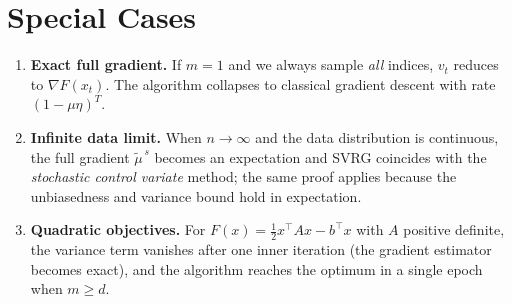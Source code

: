 \documentclass{article}
\begin{document}
\section*{Special Cases}
\begin{enumerate}[label=\textbf{C\arabic*:}, leftmargin=*]
\item \textbf{Exact full gradient.} If $m=1$ and we always sample \emph{all} indices, $v_t$ reduces to $\nabla F(x_t)$. The algorithm collapses to classical gradient descent with rate $(1-\mu\eta)^{T}$.
\item \textbf{Infinite data limit.} When $n\to\infty$ and the data distribution is continuous, the full gradient $\tilde{\mu}^{\,s}$ becomes an expectation and SVRG coincides with the \emph{stochastic control variate} method; the same proof applies because the unbiasedness and variance bound hold in expectation.
\item \textbf{Quadratic objectives.} For $F(x)=\frac{1}{2}x^{\top}Ax-b^{\top}x$ with $A$ positive definite, the variance term vanishes after one inner iteration (the gradient estimator becomes exact), and the algorithm reaches the optimum in a single epoch when $m\ge d$.
\end{enumerate}
\end{document}
